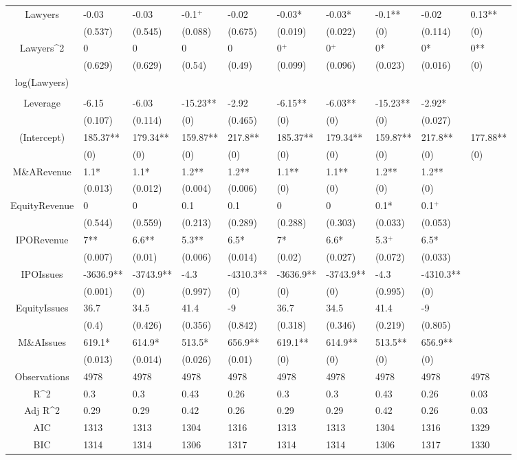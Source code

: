 \documentclass{article}
\begin{document}
\begin{table}[H]
\begin{tabular}{|clllllllll|}
Lawyers & -0.03 & -0.03 & -0.1$^{+}$ & -0.02 & -0.03* & -0.03* & -0.1** & -0.02 & 0.13** \\ 
   & (0.537) & (0.545) & (0.088) & (0.675) & (0.019) & (0.022) & (0) & (0.114) & (0) \\ 
  Lawyers^2 & 0 & 0 & 0 & 0 & 0$^{+}$ & 0$^{+}$ & 0* & 0* & 0** \\ 
   & (0.629) & (0.629) & (0.54) & (0.49) & (0.099) & (0.096) & (0.023) & (0.016) & (0) \\ 
  log(Lawyers) &  &  &  &  &  &  &  &  &  \\ 
   &  &  &  &  &  &  &  &  &  \\ 
  Leverage & -6.15 & -6.03 & -15.23** & -2.92 & -6.15** & -6.03** & -15.23** & -2.92* &  \\ 
   & (0.107) & (0.114) & (0) & (0.465) & (0) & (0) & (0) & (0.027) &  \\ 
  (Intercept) & 185.37** & 179.34** & 159.87** & 217.8** & 185.37** & 179.34** & 159.87** & 217.8** & 177.88** \\ 
   & (0) & (0) & (0) & (0) & (0) & (0) & (0) & (0) & (0) \\ 
  M\&ARevenue & 1.1* & 1.1* & 1.2** & 1.2** & 1.1** & 1.1** & 1.2** & 1.2** &  \\ 
   & (0.013) & (0.012) & (0.004) & (0.006) & (0) & (0) & (0) & (0) &  \\ 
  EquityRevenue & 0 & 0 & 0.1 & 0.1 & 0 & 0 & 0.1* & 0.1$^{+}$ &  \\ 
   & (0.544) & (0.559) & (0.213) & (0.289) & (0.288) & (0.303) & (0.033) & (0.053) &  \\ 
  IPORevenue & 7** & 6.6** & 5.3** & 6.5* & 7* & 6.6* & 5.3$^{+}$ & 6.5* &  \\ 
   & (0.007) & (0.01) & (0.006) & (0.014) & (0.02) & (0.027) & (0.072) & (0.033) &  \\ 
  IPOIssues & -3636.9** & -3743.9** & -4.3 & -4310.3** & -3636.9** & -3743.9** & -4.3 & -4310.3** &  \\ 
   & (0.001) & (0) & (0.997) & (0) & (0) & (0) & (0.995) & (0) &  \\ 
  EquityIssues & 36.7 & 34.5 & 41.4 & -9 & 36.7 & 34.5 & 41.4 & -9 &  \\ 
   & (0.4) & (0.426) & (0.356) & (0.842) & (0.318) & (0.346) & (0.219) & (0.805) &  \\ 
  M\&AIssues & 619.1* & 614.9* & 513.5* & 656.9** & 619.1** & 614.9** & 513.5** & 656.9** &  \\ 
   & (0.013) & (0.014) & (0.026) & (0.01) & (0) & (0) & (0) & (0) &  \\ 
  \hline 
 Observations & 4978 & 4978 & 4978 & 4978 & 4978 & 4978 & 4978 & 4978 & 4978 \\ 
  R^2 & 0.3 & 0.3 & 0.43 & 0.26 & 0.3 & 0.3 & 0.43 & 0.26 & 0.03 \\ 
  Adj R^2 & 0.29 & 0.29 & 0.42 & 0.26 & 0.29 & 0.29 & 0.42 & 0.26 & 0.03 \\ 
  AIC & 1313 & 1313 & 1304 & 1316 & 1313 & 1313 & 1304 & 1316 & 1329 \\ 
  BIC & 1314 & 1314 & 1306 & 1317 & 1314 & 1314 & 1306 & 1317 & 1330 \\ 
   \hline
\end{tabular}
 

\end{table}
\end{document}
